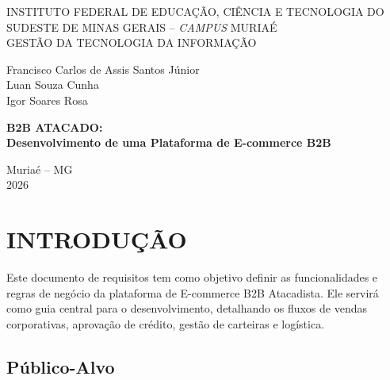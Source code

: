 \documentclass[12pt,a4paper]{article}
\begin{document}
\begin{titlepage}
  \centering
  \vspace*{1cm}
  {\large
    INSTITUTO FEDERAL DE EDUCAÇÃO, CIÊNCIA E TECNOLOGIA DO SUDESTE DE MINAS GERAIS
    -- \textit{CAMPUS} MURIAÉ\\[4pt]
    GESTÃO DA TECNOLOGIA DA INFORMAÇÃO
  }\par
  \vspace{3cm}
  {\large
    Francisco Carlos de Assis Santos Júnior\\
    Luan Souza Cunha\\
    Igor Soares Rosa
  }\par
  \vfill
  {\Large\bfseries
    B2B ATACADO:\\[6pt]
    Desenvolvimento de uma Plataforma de E-commerce B2B
  }\par
  \vfill
  {Muriaé -- MG\\2026}\par
\end{titlepage}

\tableofcontents
\newpage

\section{INTRODUÇÃO}

Este documento de requisitos tem como objetivo definir as funcionalidades e regras de negócio da plataforma de E-commerce B2B Atacadista. Ele servirá como guia central para o desenvolvimento, detalhando os fluxos de vendas corporativas, aprovação de crédito, gestão de carteiras e logística.

\subsection{Público-Alvo}
\end{document}
